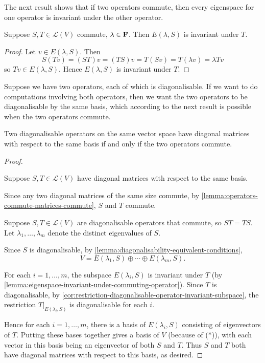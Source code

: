 The next result shows that if two operators commute, then every eigenspace for one operator is invariant under the other operator.

\begin{lemma}\label{lemma:eigenspace-invariant-under-commuting-operator}
Suppose $S,T\in\mathcal{L}(V)$ commute, $\lambda\in\mathbf F$. Then $E(\lambda,S)$ is invariant under $T$.
\end{lemma}

\begin{proof}
Let $v\in E(\lambda,S)$. Then
\[S(Tv)=(ST)v=(TS)v=T(Sv)=T(\lambda v)=\lambda Tv\]
so $Tv\in E(\lambda,S)$. Hence $E(\lambda,S)$ is invariant under $T$.
\end{proof}

Suppose we have two operators, each of which is diagonalisable. If we want to do computations involving both operators, then we want the two operators to be diagonalisable by the same basis, which according to the next result is possible when the two operators commute.

\begin{proposition}
Two diagonalisable operators on the same vector space have diagonal matrices with respect to the same basis if and only if the two operators commute.
\end{proposition}

\begin{proof} \

\fbox{$\implies$} Suppose $S,T\in\mathcal{L}(V)$ have diagonal matrices with respect to the same basis.

Since any two diagonal matrices of the same size commute, by \ref{lemma:operators-commute-matrices-commute}, $S$ and $T$ commute.

\fbox{$\impliedby$} Suppose $S,T\in\mathcal{L}(V)$ are diagonalisable operators that commute, so $ST=TS$. 
Let $\lambda_1,\dots,\lambda_m$ denote the distinct eigenvalues of $S$. 

Since $S$ is diagonalisable, by \ref{lemma:diagonalisability-equivalent-conditions},
\begin{equation*}\tag{$\ast$}
V=E(\lambda_1,S)\oplus\cdots\oplus E(\lambda_m,S).
\end{equation*}

For each $i=1,\dots,m$, the subspace $E(\lambda_i,S)$ is invariant under $T$ (by \ref{lemma:eigenspace-invariant-under-commuting-operator}).
Since $T$ is diagonalisable, by \ref{cor:restriction-diagonalisable-operator-invariant-subspace}, the restriction $T|_{E(\lambda_i,S)}$ is diagonalisable for each $i$. 

Hence for each $i=1,\dots,m$, there is a basis of $E(\lambda_i,S)$ consisting of eigenvectors of $T$. Putting these bases together gives a basis of $V$ (because of ($\ast$)), with each vector in this basis being an eigenvector of both $S$ and $T$. Thus $S$ and $T$ both have diagonal matrices with respect to this basis, as desired.
\end{proof}

